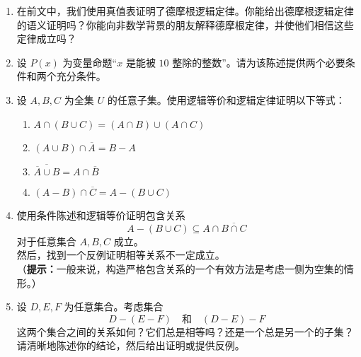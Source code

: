 \begin{enumerate}[label=(\arabic*)]
    \item 在前文中，我们使用真值表证明了德摩根逻辑定律。你能给出德摩根逻辑定律的语义证明吗？你能向非数学背景的朋友解释德摩根定律，并使他们相信这些定律成立吗？
    \item 设 $P(x)$ 为变量命题``$x$ 是能被 $10$ 整除的整数''。请为该陈述提供两个必要条件和两个充分条件。
    \item 设 $A,B,C$ 为全集 $U$ 的任意子集。使用逻辑等价和逻辑定律证明以下等式：
        \begin{enumerate}[label=(\alph*)]
            \item $A \cap (B \cup C) = (A \cap B) \cup (A \cap C)$
            \item $(A \cup B) \cap \overline{A} = B - A$
            \item $\overline{\overline{A} \cup B} = A \cap \overline{B}$
            \item $(A - B) \cap \overline{C} = A - (B \cup C)$
        \end{enumerate}
    \item 使用条件陈述和逻辑等价证明包含关系
        \[A - (B \cup C) \subseteq A \cap \overline{B \cap C}\]
        对于任意集合 $A,B,C$ 成立。\\
        然后，找到一个反例证明相等关系不一定成立。\\
        （\textbf{提示：}一般来说，构造严格包含关系的一个有效方法是考虑一侧为空集的情形。）
    \item 设 $D,E,F$ 为任意集合。考虑集合
        \[D - (E - F) \quad \text{和} \quad (D - E) - F\]
        这两个集合之间的关系如何？它们总是相等吗？还是一个总是另一个的子集？\\
        请清晰地陈述你的结论，然后给出证明或提供反例。
\end{enumerate}